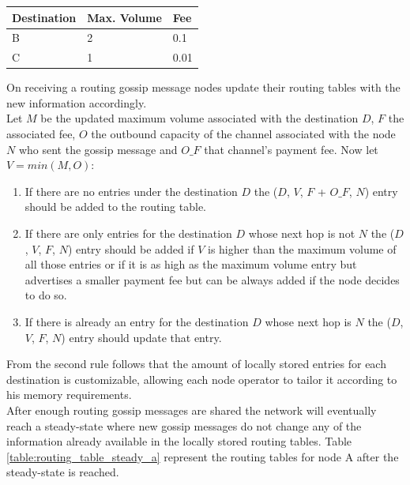 \begin{table}[H]
\centering
\begin{tabular}{|l|l|l|}
\hline
\rowcolor[HTML]{C0C0C0} 
Destination & Max. Volume   & Fee   \\ \hline
B           & 2             & 0.1   \\ \hline
C           & 1             & 0.01  \\ \hline
\end{tabular}
\label{table:routing_gossip}
\end{table}

On receiving a routing gossip message nodes update their routing tables with the new information accordingly. \\
Let $M$ be the updated maximum volume associated with the destination $D$, $F$ the associated fee, $O$ the outbound capacity of the channel associated with the node $N$ who sent the gossip message and $O\_F$ that channel's payment fee. Now let $V = min(M, O)$: \\

\begin{enumerate}

\item If there are no entries under the destination $D$ the ($D$, $V$, $F$ + $O\_F$, $N$) entry should be added to the routing table.
\item If there are only entries for the destination $D$ whose next hop is not $N$ the ($D$, $V$, $F$, $N$) entry should be added if $V$ is higher than the maximum volume of all those entries or if it is as high as the maximum volume entry but advertises a smaller payment fee but can be always added if the node decides to do so.
\item If there is already an entry for the destination $D$ whose next hop is $N$ the ($D$, $V$, $F$, $N$) entry should update that entry.

\end{enumerate}

From the second rule follows that the amount of locally stored entries for each destination is customizable, allowing each node operator to tailor it according to his memory requirements.\\
After enough routing gossip messages are shared the network will eventually reach a steady-state where new gossip messages do not change any of the information already available in the locally stored routing tables. Table \ref{table:routing_table_steady_a} represent the routing tables for node A after the steady-state is reached.

